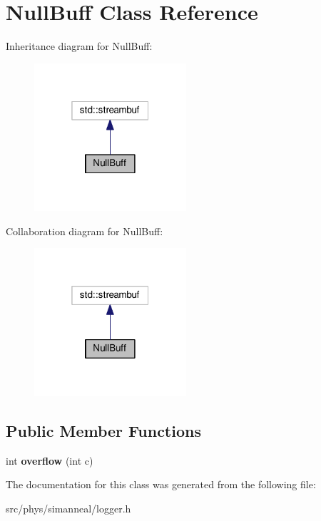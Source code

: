 \hypertarget{classNullBuff}{}\section{Null\+Buff Class Reference}
\label{classNullBuff}


Inheritance diagram for Null\+Buff\+:
\nopagebreak
\begin{figure}[H]
\begin{center}
\leavevmode
\includegraphics[width=160pt]{classNullBuff__inherit__graph}
\end{center}
\end{figure}


Collaboration diagram for Null\+Buff\+:
\nopagebreak
\begin{figure}[H]
\begin{center}
\leavevmode
\includegraphics[width=160pt]{classNullBuff__coll__graph}
\end{center}
\end{figure}
\subsection*{Public Member Functions}
\begin{DoxyCompactItemize}
\item 
int {\bfseries overflow} (int c)\hypertarget{classNullBuff_a4e680f7d99aa4b832eae20a3a2e83309}{}\label{classNullBuff_a4e680f7d99aa4b832eae20a3a2e83309}

\end{DoxyCompactItemize}


The documentation for this class was generated from the following file\+:\begin{DoxyCompactItemize}
\item 
src/phys/simanneal/logger.\+h\end{DoxyCompactItemize}

